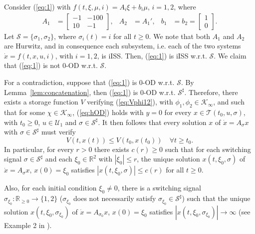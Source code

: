 \documentclass[9pt,final,journal]{IEEEtran}
\def\K{\mathcal{K}}
\def\Ki{\K_{\infty}}
\def\R{\mathbb{R}}
\def\S{\mathcal{S}}
\def\T{\mathcal{T}}
\def\U{\mathcal{U}}
\begin{document}
\begin{IEEEproof}
Consider (\ref{eq:1}) with $f(t,\xi,\mu,i)=A_i\xi+b_i\mu$, $i=1,2$, where 
\begin{align*}
  A_1 &= \left[
        \begin{array}{rr}
          -1 & -100 \\
          10 & -1
        \end{array}\right],
 &A_2 &= A_1',
 &b_1 &= b_2 =
        \begin{bmatrix}
          1\\ 0
        \end{bmatrix}.
\end{align*}
Let $\S=\{\sigma_1,\sigma_2\}$, where $\sigma_i(t)=i$ for all $t\ge 0$. We note that both $A_1$ and $A_2$ are Hurwitz, and in consequence each subsystem, i.e. each of the two systems $\dot x = f(t,x,u,i)$, with $i=1,2$, is iISS. Then, (\ref{eq:1}) is iISS w.r.t. $\S$. We claim that (\ref{eq:1}) is not 0-OD w.r.t. $\S$. 

For a contradiction, suppose that (\ref{eq:1}) is 0-OD w.r.t. $\S$. By Lemma~\ref{lem:concatenation}, then (\ref{eq:1}) is 0-OD w.r.t. $\S^{\sharp}$. Therefore, there exists a storage function $V$ verifying (\ref{eq:Vphi12}), with $\phi_1,\phi_2\in \Ki$, and such that for some $\chi\in \Ki$, (\ref{eq:hOD}) holds with $y=0$ for every $x\in \T(t_0,u,\sigma)$, with $t_0\ge 0$, $u\in \U_1$ and $\sigma\in \S^\sharp$. It then follows that every solution $x$ of $\dot{x}=A_{\sigma}x$ with $\sigma \in \S^{\sharp}$ must verify $$ V(t,x(t))\le V(t_0,x(t_0))\quad \forall t\ge t_0.$$
In particular, for every $r>0$ there exists $c(r)\ge 0$ such that for each switching signal $\sigma \in \S^{\sharp}$ and each $\xi_0\in \R^2$ with $|\xi_0|\le r$, the unique solution $x(t,\xi_0,\sigma)$ of $\dot{x}=A_{\sigma}x$, $x(0)=\xi_0$ satisfies $|x(t,\xi_0,\sigma)|\le c(r)$ for all $t\ge 0$.

Also, for each initial condition $\xi_0\neq 0$, there is a switching signal $\sigma_{\xi_0}:\R_{\ge 0}\to \{1,2\}$ ($\sigma_{\xi_0}$ does not necessarily satisfy $\sigma_{\xi_0} \in \S^\sharp$) such that the unique solution $x(t,\xi_0,\sigma_{\xi_0})$ of $\dot{x}=A_{\sigma_0}x$, $x(0)=\xi_0$ satisfies $|x(t,\xi_0,\sigma_{\xi_0})|\to \infty$ (see Example 2 in \cite{decbra_pieee00}).


\end{IEEEproof}
\end{document}
